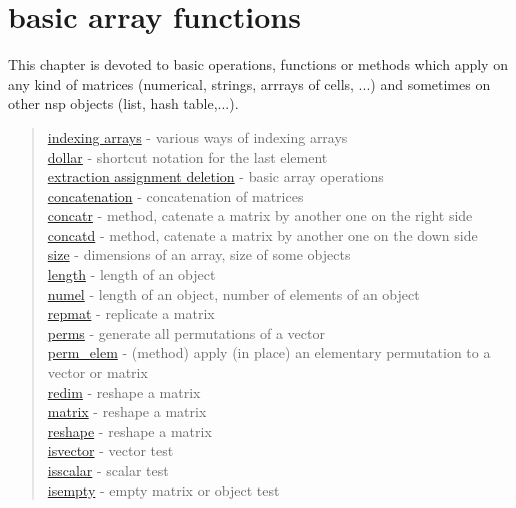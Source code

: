 \chapter*{basic array functions}

This chapter is devoted to basic operations, functions or methods which apply on
any kind of matrices (numerical, strings, arrrays of cells, ...) and sometimes
on other nsp objects (list, hash table,...).

\begin{quote}
\noindent
\hyperlink{indexing arrays}{indexing arrays} - various ways of indexing arrays \\
\hyperlink{dollar}{dollar} - shortcut notation for the last element\\
\hyperlink{extraction assignment deletion}{extraction assignment deletion} - basic array operations\\
\hyperlink{concatenation}{concatenation} - concatenation of matrices\\
\hyperlink{concatr}{concatr} - method, catenate a matrix by another one on the right side\\   
\hyperlink{concatd}{concatd} - method, catenate a matrix by another one on the down side\\   
\hyperlink{size}{size} - dimensions of an array, size of some objects \\
\hyperlink{length}{length} - length of an object  \\
\hyperlink{numel}{numel} - length of an object, number of elements of an object  \\
\hyperlink{repmat}{repmat} - replicate a matrix\\
\hyperlink{perms}{perms} - generate all permutations of a vector\\
\hyperlink{perm_elem}{perm\_elem} - (method) apply (in place) an elementary permutation to a vector or matrix \\
\hyperlink{redim}{redim} - reshape a matrix\\
\hyperlink{matrix}{matrix} - reshape a matrix\\
\hyperlink{reshape}{reshape} - reshape a matrix\\
\hyperlink{isvector}{isvector} - vector test\\
\hyperlink{isscalar}{isscalar} - scalar test\\
\hyperlink{isempty}{isempty} - empty matrix or object test\\
\end{quote}










